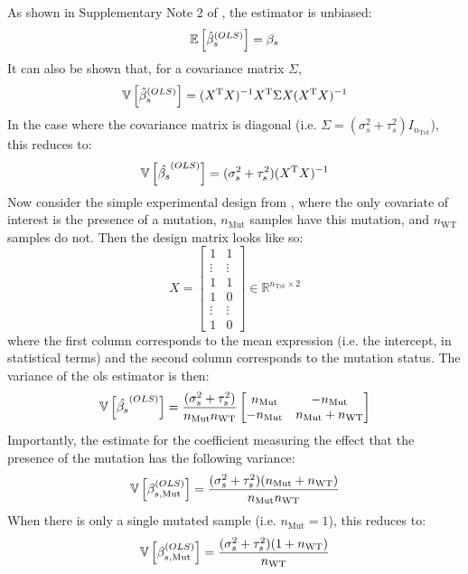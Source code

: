 As shown in Supplementary Note 2 of \cite[REF][]{pimentelDifferentialAnalysisRNAseq2017}, the estimator is unbiased:
%
\begin{equation}
  \mathbb{E} \left[  \hat{\beta}_s^{(OLS)}  \right] = \beta_s
\end{equation}
%
It can also be shown that, for a covariance matrix $\Sigma$,
%
\begin{equation}
  \mathbb{V} \left[  \hat{\beta}_s^{(OLS)}  \right] = (X^{\mathrm{T}} X)^{-1} X^{\mathrm{T}} \Sigma X (X^{\mathrm{T}} X)^{-1}
\end{equation}
%
In the case where the covariance matrix is diagonal (i.e. $\Sigma = (\sigma_s^2 + \tau_s^2)I_{n_\mathrm{Tot}}$), this reduces to:
%
\begin{equation}
  \mathbb{V} \left[  \hat{\beta_s}^{(OLS)}  \right] = (\sigma_s^2 + \tau_s^2)(X^{\mathrm{T}} X)^{-1}
\end{equation}
%
Now consider the simple experimental design from , where the only covariate of interest is the presence of a mutation, $n_\mathrm{Mut}$ samples have this mutation, and $n_\mathrm{WT}$ samples do not.
Then the design matrix looks like so:
%
\begin{equation}
  X = \begin{bmatrix}
    1      & 1      \\
    \vdots & \vdots \\
    1      & 1      \\
    1      & 0      \\
    \vdots & \vdots \\
    1      & 0
  \end{bmatrix}
  \in \mathbb{R}^{n_\mathrm{Tot} \times 2}
\end{equation}
%
where the first column corresponds to the mean expression (i.e. the intercept, in statistical terms) and the second column corresponds to the mutation status.
The variance of the \gls{ols} estimator is then:
%
\begin{equation}
  \mathbb{V} \left[  \hat{\beta_s}^{(OLS)}  \right] = \frac{(\sigma_s^2 + \tau_s^2)}{n_\mathrm{Mut} n_\mathrm{WT}}
  \begin{bmatrix}
    n_\mathrm{Mut}   & -n_\mathrm{Mut}                \\
    - n_\mathrm{Mut} & n_\mathrm{Mut} + n_\mathrm{WT} \\
  \end{bmatrix}
\end{equation}
%
Importantly, the estimate for the coefficient measuring the effect that the presence of the mutation has the following variance:
%
\begin{equation}
  \mathbb{V} \left[  \beta_{s,\mathrm{Mut}}^{(OLS)}  \right] = \frac{(\sigma_s^2 + \tau_s^2)(n_\mathrm{Mut} + n_\mathrm{WT})}{n_\mathrm{Mut} n_\mathrm{WT}}
\end{equation}
%
When there is only a single mutated sample (i.e. $n_\mathrm{Mut} = 1$), this reduces to:
%
\begin{equation}
  \mathbb{V} \left[  \beta_{s,\mathrm{Mut}}^{(OLS)}  \right] = \frac{(\sigma_s^2 + \tau_s^2)(1 + n_\mathrm{WT})}{n_\mathrm{WT}}
\end{equation}

